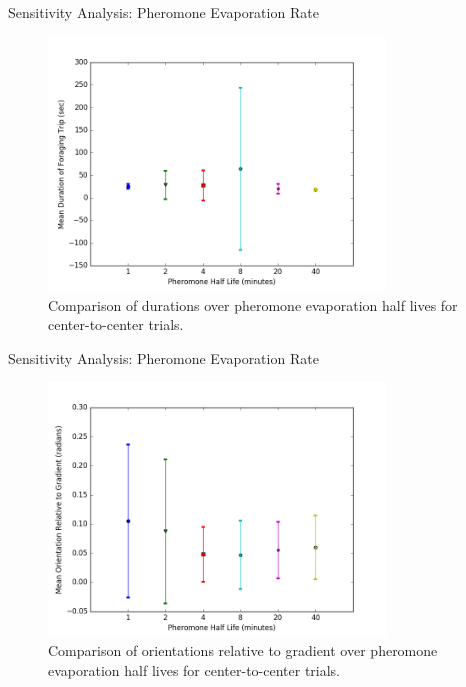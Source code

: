\begin{frame}{Sensitivity Analysis: Pheromone Evaporation Rate}
	\begin{figure}
	\includegraphics[width=0.8\textwidth]{results/center-to-center-sensitivityanalysis-duration.png}
	\caption{Comparison of durations over pheromone evaporation half lives for center-to-center trials.}
	\end{figure}
\end{frame}

\begin{frame}{Sensitivity Analysis: Pheromone Evaporation Rate}
	\begin{figure}
	\includegraphics[width=0.8\textwidth]{results/center-to-center-sensitivityanalysis-meanorientation.png}
	\caption{Comparison of orientations relative to gradient over pheromone evaporation half lives for center-to-center trials.}
	\end{figure}
\end{frame}

